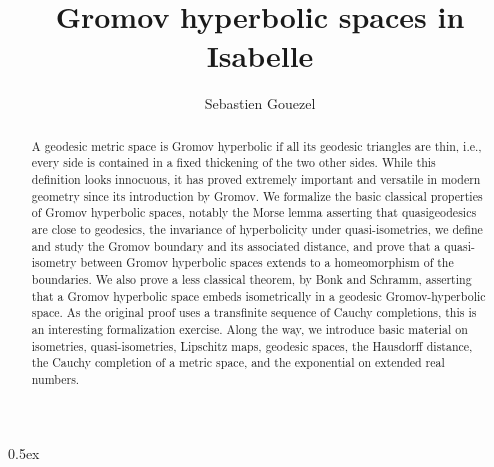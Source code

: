 \documentclass[11pt,a4paper]{article}
\begin{document}
\title{Gromov hyperbolic spaces in Isabelle}
\author{Sebastien Gouezel}
\date{}
\maketitle

\begin{abstract}
A geodesic metric space is Gromov hyperbolic if all its geodesic triangles
are thin, i.e., every side is contained in a fixed thickening of the two
other sides. While this definition looks innocuous, it has proved extremely
important and versatile in modern geometry since its introduction by
Gromov. We formalize the basic classical properties of Gromov hyperbolic
spaces, notably the Morse lemma asserting that quasigeodesics are close to
geodesics, the invariance of hyperbolicity under quasi-isometries, we
define and study the Gromov boundary and its associated distance, and prove
that a quasi-isometry between Gromov hyperbolic spaces extends to a
homeomorphism of the boundaries. We also prove a less classical theorem, by
Bonk and Schramm, asserting that a Gromov hyperbolic space embeds
isometrically in a geodesic Gromov-hyperbolic space. As the original proof
uses a transfinite sequence of Cauchy completions, this is an interesting
formalization exercise. Along the way, we introduce basic material on
isometries, quasi-isometries, Lipschitz maps, geodesic spaces, the
Hausdorff distance, the Cauchy completion of a metric space, and the
exponential on extended real numbers.
\end{abstract}

\tableofcontents

\parindent 0pt\parskip 0.5ex





\end{document}
